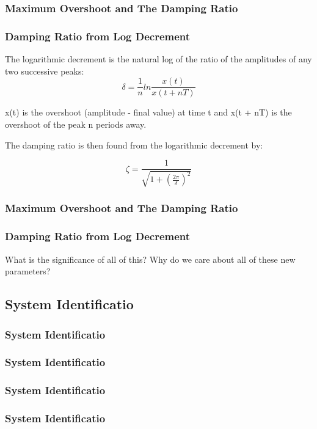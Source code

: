 \documentclass[fleqn]{beamer} %
\newcommand{\sectionIVsubsectionIIItitle}{Maximum Overshoot and The Damping Ratio}
\newcommand{\sectionIVsubsectionIVtitle}{System Identificatio}
\begin{document}
			\begin{frame}
				\frametitle{\sectionIVsubsectionIIItitle}
				\bigskip

				\frametitle{Damping Ratio from Log Decrement}

				The logarithmic decrement is the natural log of the ratio of the amplitudes of any two successive peaks: 
				\[ \delta=\frac{1}{n}ln\frac{x(t)}{x(t+nT)} \]

				x(t) is the overshoot (amplitude - final value) at time t and x(t + nT) is the overshoot of the peak n periods away. \vspc

				The damping ratio is then found from the logarithmic decrement by: 

				\[ \zeta=\frac{1}{\sqrt{1+\left(\frac{2\pi}{\delta}\right)^2}} \]

				\btVFill
			\end{frame}

			\begin{frame}
				\frametitle{\sectionIVsubsectionIIItitle}
				\bigskip

				\frametitle{Damping Ratio from Log Decrement}

				What is the significance of all of this? \vspc
				Why do we care about all of these new parameters?

				\btVFill
			\end{frame}

		\subsection{\sectionIVsubsectionIVtitle}\label{sectionIVsubsectionIV}	

			\begin{frame}
				\frametitle{\sectionIVsubsectionIVtitle}
				\bigskip
	

				\btVFill 
			\end{frame}

			\begin{frame}
				\frametitle{\sectionIVsubsectionIVtitle}
				\bigskip

			

		 		\btVFill 
			\end{frame}
			
			\begin{frame}
				\frametitle{\sectionIVsubsectionIVtitle}
				\bigskip
				
				
					
				\btVFill 
			\end{frame}

			\begin{frame}
				\frametitle{\sectionIVsubsectionIVtitle}
				\bigskip
			
				
				\btVFill 
			\end{frame}
\end{document}
